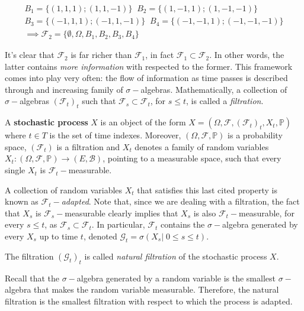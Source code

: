 \begin{gather*}
    B_1 = \Big\{ (1,1,1) ; (1,1,-1) \Big\} \;\; B_2 = \Big\{ (1,-1,1); (1,-1,-1) \Big\} \\
    B_3 = \Big\{ (-1,1,1) ; (-1,1,-1) \Big\} \;\;     B_4 = \Big\{ (-1,-1,1) ; (-1,-1,-1) \Big\} \\
    \implies \mathcal{F_2} = \Big\{ \emptyset, \Omega, B_1,B_2,B_3,B_4 \Big\}
\end{gather*}

It's clear that $\mathcal{F}_2$ is far richer than $\mathcal{F}_1$, in fact $\mathcal{F}_1 \subset \mathcal{F}_2$. In other words, the latter contains \textit{more information} with respected to the former. This framework comes into play very often: the flow of information as time passes is described through and increasing family of $\sigma-$algebras. Mathematically, a collection of $\sigma-$algebras $(\mathcal{F}_t)_t$ such that $\mathcal{F}_s \subset \mathcal{F}_t$, for $s \leq t$, is called a \textit{filtration}.

\begin{definition}
    A \textbf{stochastic process} $X$ is an object of the form $X = (\Omega, \mathcal{F}, (\mathcal{F}_t)_t, X_t, \mathbb{P})$ where $t \in T$ is the set of time indexes. Moreover, $(\Omega, \mathcal{F}, \mathbb{P})$ is a probability space, $(\mathcal{F}_t)$ is a filtration and $X_t$ denotes a family of random variables $X_t : (\Omega,\mathcal{F},\mathbb{P}) \to (E,\mathcal{B})$, pointing to a measurable space, such that every single $X_t$ is $\mathcal{F}_t-$measurable. 
\end{definition}

A collection of random variables $X_t$ that satisfies this last cited property is known as $\mathcal{F}_t-$\textit{adapted}. Note that, since we are dealing with a filtration, the fact that $X_s$ is $\mathcal{F}_s-$measurable clearly implies that $X_s$ is also $\mathcal{F}_t-$measurable, for every $s \leq t$, as $\mathcal{F}_s \subset \mathcal{F}_t$. In particular, $\mathcal{F}_t$ contains the $\sigma-$algebra generated by every $X_s$ up to time $t$, denoted $\mathcal{G}_t = \sigma(X_s \vert \; 0 \leq s \leq t)$. 

\begin{definition}
    The filtration $(\mathcal{G}_t)_t$ is called \textit{natural filtration} of the stochastic process $X$.
\end{definition}

Recall that the $\sigma-$algebra generated by a random variable is the smallest $\sigma-$algebra that makes the random variable measurable. Therefore, the natural filtration is the smallest filtration with respect to which the process is adapted. 

